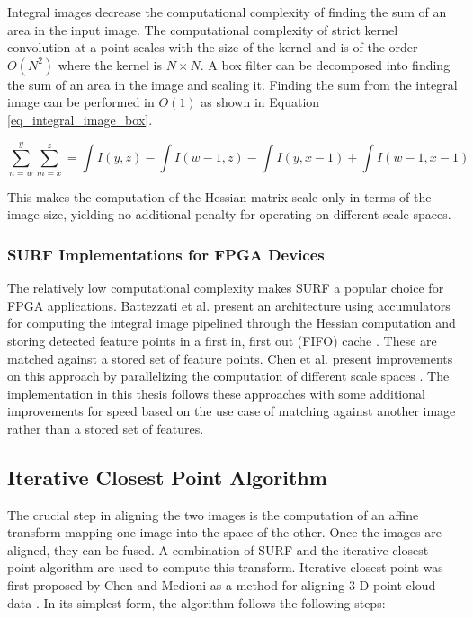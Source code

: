 \documentclass[sigconf]{acmart/acmart}
\begin{document}
Integral images decrease the computational complexity of finding the sum of an area in the input image. The computational complexity of strict kernel convolution at a point scales with the size of the kernel and is of the order $O(N^2)$ where the kernel is $N \times N$. A box filter can be decomposed into finding the sum of an area in the image and scaling it. Finding the sum from the integral image can be performed in $O(1)$ as shown in Equation \ref{eq_integral_image_box}. 

\begin{equation}
\sum\limits_{n=w}^y \sum\limits_{m=x}^z = \int I(y,z) - \int I(w-1,z) - \int I(y,x-1) + \int I(w-1, x-1)
\label{eq_integral_image_box}
\end{equation}

This makes the computation of the Hessian matrix scale only in terms of the image size, yielding no additional penalty for operating on different scale spaces.

\subsubsection{SURF Implementations for FPGA Devices}

The relatively low computational complexity makes SURF a popular choice for FPGA applications. Battezzati et al. present an architecture using accumulators for computing the integral image pipelined through the Hessian computation and storing detected feature points in a first in, first out (FIFO) cache \cite{battezzati_surf_2012}. These are matched against a stored set of feature points. Chen et al. present improvements on this approach by parallelizing the computation of different scale spaces \cite{chen_fpga-based_2016}. The implementation in this thesis follows these approaches with some additional improvements for speed based on the use case of matching against another image rather than a stored set of features.

\subsection{Iterative Closest Point Algorithm}

The crucial step in aligning the two images is the computation of an affine transform mapping one image into the space of the other. Once the images are aligned, they can be fused. A combination of SURF and the iterative closest point algorithm are used to compute this transform. Iterative closest point was first proposed by Chen and Medioni as a method for aligning 3-D point cloud data \cite{chen_object_1992}. In its simplest form, the algorithm follows the following steps:
\end{document}

